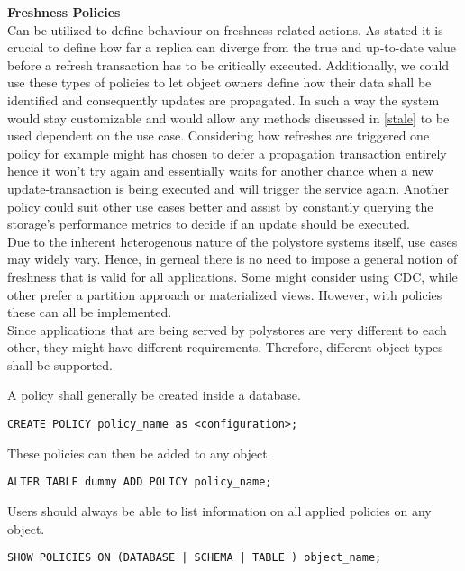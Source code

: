 \textbf{Freshness Policies}\\
Can be utilized to define behaviour on freshness related actions. As \cite{fekete:2018} stated it is crucial to define how far a replica can diverge from the true
and up-to-date value before a refresh transaction has to be critically executed.
Additionally, we could use these types of policies to let object owners define how their data shall be identified and consequently updates are propagated.
In such a way the system would stay customizable and would allow any methods discussed in \ref{stale} to be used dependent on the use case.
Considering how refreshes are triggered one policy for example might has chosen to defer a propagation transaction entirely hence it won't try again and
essentially waits for another chance when a new update-transaction is being executed and will trigger the service again. Another policy could suit other use cases better 
and assist by constantly querying the storage's performance metrics to decide if an update should be executed.\\

Due to the inherent heterogenous nature of the polystore systems itself, use cases may widely vary. Hence, in gerneal there is no need to impose a 
general notion of freshness that is valid for all applications. Some might consider using CDC, while other prefer a partition approach or materialized views.
However, with policies these can all be implemented.\\



Since applications that are being served by polystores are very different to each other, they might have different requirements. 
Therefore, different object types shall be supported.

A policy shall generally be created inside a database.
\begin{verbatim}
CREATE POLICY policy_name as <configuration>;
\end{verbatim}

These policies can then be added to any object.
\begin{verbatim}
ALTER TABLE dummy ADD POLICY policy_name;
\end{verbatim}

Users should always be able to list information on all applied policies on any object.
\begin{verbatim}
SHOW POLICIES ON (DATABASE | SCHEMA | TABLE ) object_name;
\end{verbatim}


